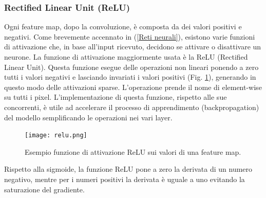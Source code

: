 \subsubsection{Rectified Linear Unit (ReLU)}
Ogni feature map, dopo la convoluzione, è composta da dei valori positivi e negativi. 
Come brevemente accennato in (\ref{Reti neurali}), esistono varie funzioni di attivazione che, in 
base all'input ricevuto, decidono se attivare o disattivare un neurone. La 
funzione di attivazione maggiormente usata è la ReLU (Rectified Linear Unit). 
Questa funzione esegue delle operazioni non lineari ponendo a zero tutti i valori 
negativi e lasciando invariati i valori positivi (Fig. \ref{relu}), generando in questo modo delle 
attivazioni sparse.  L'operazione prende il nome di element-wise su tutti i pixel. 
L'implementazione di questa funzione, rispetto alle sue concorrenti, è utile ad accelerare 
il processo di apprendimento (backpropagation) del modello semplificando 
le operazioni nei vari layer.
\begin{figure}
    \centering
    \texttt{[image: relu.png]}
    \centering
    \caption{Esempio funzione di attivazione ReLU sui valori di una feature map.}
    \label{relu}
\end{figure}
Rispetto alla sigmoide, la funzione ReLU pone a zero la derivata di un numero 
negativo, mentre per i numeri positivi la derivata è uguale a uno evitando la 
saturazione del gradiente.

